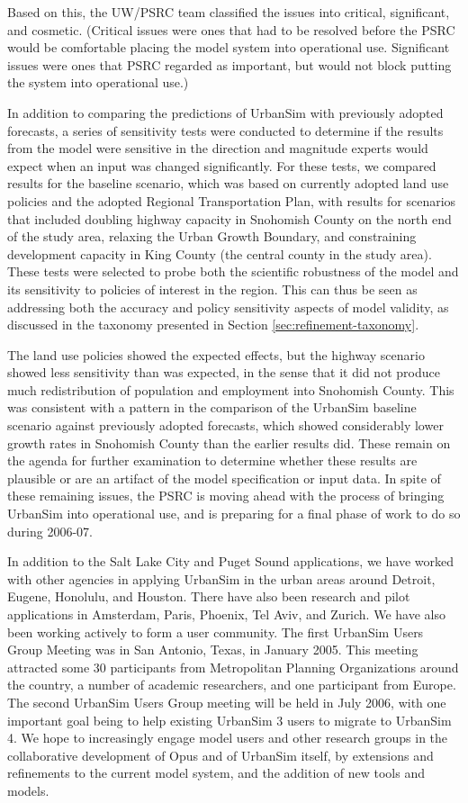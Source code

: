 Based on this, the UW/PSRC team classified the issues into critical,
significant, and cosmetic.  (Critical issues were ones that had to be
resolved before the PSRC would be comfortable placing the model system into
operational use.  Significant issues were ones that PSRC regarded as
important, but would not block putting the system into operational use.)

In addition to comparing the predictions of UrbanSim with previously
adopted forecasts, a series of sensitivity tests were conducted to
determine if the results from the model were sensitive in the
direction and magnitude experts would expect when an input was
changed significantly.  For these tests, we compared results for the baseline
scenario, which was based on currently adopted land use policies and
the adopted Regional Transportation Plan, with results for
scenarios that included
doubling highway capacity in Snohomish County on the north end of
the study area, relaxing the Urban Growth Boundary, and constraining
development capacity in King County (the central county in the study
area).  These tests 
were selected to probe both the scientific robustness of the
model and its sensitivity to policies of interest in the region.
This can thus be seen as addressing both the accuracy and policy
sensitivity aspects of model validity, as discussed in the taxonomy
presented in Section \ref{sec:refinement-taxonomy}.

The land use policies showed the expected effects, but the
highway scenario showed less sensitivity than was expected, in the
sense that it did not produce much redistribution of population and
employment into Snohomish County.  This was consistent with a
pattern in the comparison of the UrbanSim baseline scenario against
previously adopted forecasts, which showed considerably lower growth
rates in Snohomish County than the earlier results did.  These
remain on the agenda for further examination to determine whether
these results are plausible or are an artifact of the model
specification or input data.  In spite of these remaining issues,
the PSRC is moving ahead with the process of bringing UrbanSim into
operational use, and is preparing for a final phase of work to do so
during 2006-07.

In addition to the Salt Lake City and Puget Sound applications, we
have worked with other agencies in applying UrbanSim in the urban
areas around Detroit, Eugene, Honolulu, and Houston.  There have
also been research and pilot applications in Amsterdam, Paris,
Phoenix, Tel Aviv, and Zurich. We have also been working actively to
form a user community.  The first UrbanSim Users Group Meeting was
in San Antonio, Texas, in January 2005. This meeting attracted some
30 participants from Metropolitan Planning Organizations around the
country, a number of academic researchers, and one participant from
Europe.  The second UrbanSim Users Group meeting will be held in
July 2006, with one important goal being to help existing UrbanSim 3
users to migrate to UrbanSim 4.  We hope to increasingly engage
model users and other research groups in the collaborative
development of Opus and of
UrbanSim itself, by extensions and refinements to the current model
system, and the addition of new tools and models.

